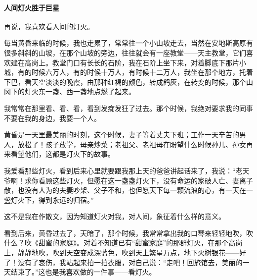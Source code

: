 \paragraph*{人间灯火胜于巨星}
\par 再说，我喜欢看人间的灯火。
\par 每当黄昏来临的时候，我也走累了，常常往一个小山坡走去，当然在安地斯高原有很多斜斜的山坡，在那个山坡的旁边，往往就会有一座教堂——天主教堂，它们喜欢建在高岗上。教堂门口有长长的石阶，我在石阶上坐下来，对着脚底下那片小城，有的时候六万人，有的时候十万人，有时候十二万人，我坐在那个地方，托着下巴，看天空淡淡的晚霞，由那种红褐的颜色，转成鸽灰，在转变的时候，那个山冈下的灯火东一盏、西一盏地点燃了起来。
\par 我常常在那里看、看、看，看到发痴发狂了过去。那个时候，我绝对要求我的同事不要在我的身边，我要一个人。
\par 黄昏是一天里最美丽的时刻，这个时候，妻子等着丈夫下班；工作一天辛苦的男人，放松了！孩子放学，母亲炒菜；老祖父、老祖母在盼望什么时候孙儿、孙女再来看望他们，这都是灯火下的故事。
\par 我爱看那些灯火，看到后来心里就要跟我那上天的爸爸讲起话来了，我说：“老天爷啊！求你看顾这些灯火，但愿在这一盏盏灯火下，没有命运的家破人亡、妻离子散，也没有人为的夫妻吵架、父子不和，也但愿天下每一颗流浪的心，有一天在一盏灯火下，得到永远的归宿。”
\par 这不是我在作散文，因为知道灯火对我，对人间，象征着什么样的意义。
\par 看到后来，黄昏过去了，天暗了，那个时候，我常常拿出我的口琴来轻轻地吹，吹什么？吹《甜蜜的家庭》。对着不知道已有“甜蜜家庭”的那群灯火，在那个高岗上，静静地吹，吹到天空变成深蓝色，吹到天上繁星万点，地下火树银花——好了！没有了哀伤，我站起来拍一拍衣服，对自己说：“走吧！回旅馆去，美丽的一天结束了。”这也是我喜欢做的一件事——看灯火。
